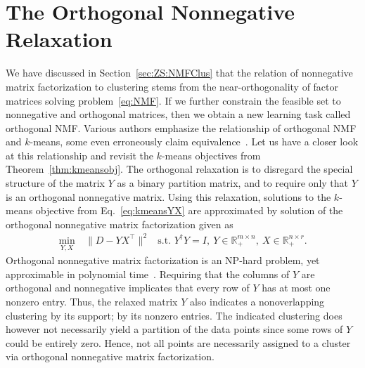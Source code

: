 \section{The Orthogonal Nonnegative  Relaxation}\label{sec:ZS:OrthogonalRelaxation} 
We have discussed in Section~\ref{sec:ZS:NMFClus} that the relation of nonnegative matrix factorization to clustering stems from the near-orthogonality of factor matrices solving problem~\eqref{eq:NMF}. If we further constrain the feasible set to nonnegative and orthogonal  matrices, then we obtain a new learning task called orthogonal NMF.
Various authors emphasize the relationship of orthogonal NMF and $k$-means, some even erroneously claim equivalence~\citep{ding2005equivalence, ding2006orthogonal, li2006relationships}. Let us have a closer look at this relationship and revisit the $k$-means objectives from Theorem~\ref{thm:kmeansobj}. The orthogonal relaxation is to disregard the special structure of the matrix $Y$ as a binary partition matrix, and to require only that $Y$ is an orthogonal nonnegative matrix. Using this relaxation, solutions to the $k$-means objective from Eq.~\eqref{eq:kmeansYX} are approximated by solution of the orthogonal nonnegative matrix factorization given as
\begin{align}\label{eq:ONMF}
    \min_{Y,X} &\ \|D-YX^\top\|^2 &\text{s.t. } Y^\dagger Y=I,\  Y\in\mathbb{R}_+^{m\times n},\  X\in\mathbb{R}_+^{n\times r}.
\end{align}
Orthogonal nonnegative matrix factorization is an NP-hard problem, yet approximable in polynomial time~\cite{asteris2015orthogonal}.
Requiring that the columns of $Y$ are orthogonal and nonnegative implicates that every row of $Y$ has at most one nonzero entry. Thus, the relaxed matrix $Y$ also indicates a nonoverlapping clustering by its support; by its nonzero entries. The indicated clustering does however not necessarily yield a partition of the data points since some rows of $Y$ could be entirely zero. Hence, not all points are necessarily assigned to a cluster via orthogonal nonnegative matrix factorization.

